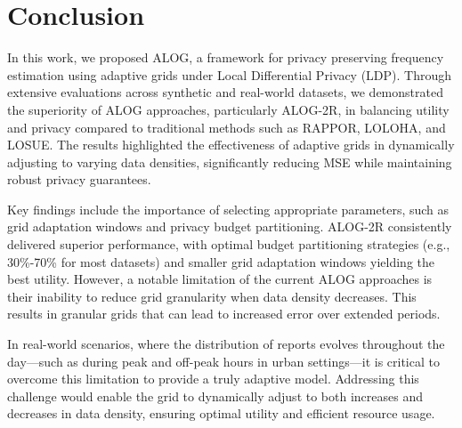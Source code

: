\section{Conclusion}
\label{sec:conclusion}

In this work, we proposed ALOG, a framework for privacy preserving frequency estimation using adaptive grids under Local Differential Privacy (LDP). Through extensive evaluations across synthetic and real-world datasets, we demonstrated the superiority of ALOG approaches, particularly ALOG-2R, in balancing utility and privacy compared to traditional methods such as RAPPOR, LOLOHA, and LOSUE. The results highlighted the effectiveness of adaptive grids in dynamically adjusting to varying data densities, significantly reducing MSE while maintaining robust privacy guarantees.

Key findings include the importance of selecting appropriate parameters, such as grid adaptation windows and privacy budget partitioning. ALOG-2R consistently delivered superior performance, with optimal budget partitioning strategies (e.g., 30\%-70\% for most datasets) and smaller grid adaptation windows yielding the best utility. However, a notable limitation of the current ALOG approaches is their inability to reduce grid granularity when data density decreases. This results in granular grids that can lead to increased error over extended periods.

In real-world scenarios, where the distribution of reports evolves throughout the day—such as during peak and off-peak hours in urban settings—it is critical to overcome this limitation to provide a truly adaptive model. Addressing this challenge would enable the grid to dynamically adjust to both increases and decreases in data density, ensuring optimal utility and efficient resource usage.


